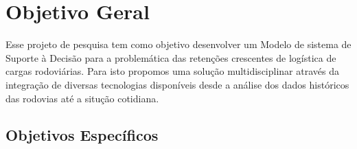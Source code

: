\section{ Objetivo Geral}\label{intro:objetivo}

Esse projeto de pesquisa tem como objetivo desenvolver um Modelo de sistema de Suporte à Decisão para a problemática das retenções crescentes 
de logística de cargas rodoviárias. Para isto propomos uma solução multidisciplinar através da integração de diversas tecnologias disponíveis desde a análise dos 
dados históricos das rodovias até a situção cotidiana.

\subsection{ Objetivos Específicos}\label{intro:especificos}

